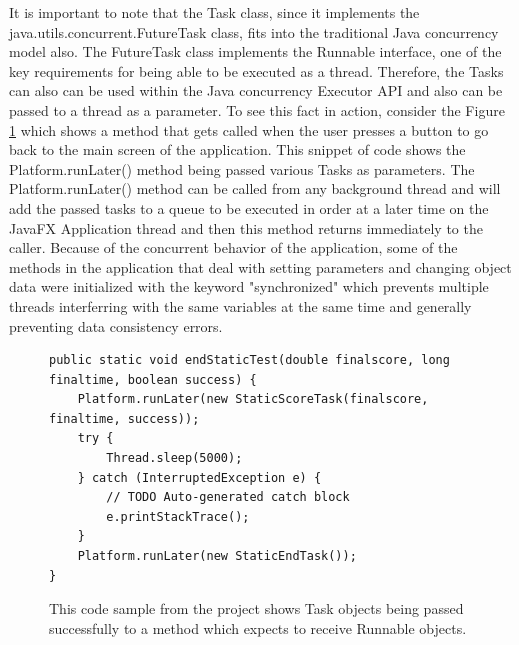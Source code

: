 It is important to note that the Task class, since it implements the java.utils.concurrent.FutureTask class, fits into the traditional Java concurrency model also. The FutureTask class implements the Runnable interface, one of the key requirements for being able to be executed as a thread. Therefore, the Tasks can also can be used within the Java concurrency Executor API and also can be passed to a thread as a parameter. To see this fact in action, consider the Figure \ref{fig:platformRunLater} which shows a method that gets called when the user presses a button to go back to the main screen of the application. This snippet of code shows the Platform.runLater() method being passed various Tasks as parameters. The Platform.runLater() method can be called from any background thread and will add the passed tasks to a queue to be executed in order at a later time on the JavaFX Application thread and then this method returns immediately to the caller. Because of the concurrent behavior of the application, some of the methods in the application that deal with setting parameters and changing object data were initialized with the keyword "synchronized" which prevents multiple threads interferring with the same variables at the same time and generally preventing data consistency errors. 

\begin{figure}[th]
\centering
\begin{lstlisting}
public static void endStaticTest(double finalscore, long finaltime, boolean success) {
	Platform.runLater(new StaticScoreTask(finalscore, finaltime, success));
	try {
		Thread.sleep(5000);
	} catch (InterruptedException e) {
		// TODO Auto-generated catch block
		e.printStackTrace();
	}
	Platform.runLater(new StaticEndTask());
}
\end{lstlisting}
\caption[Passing Task as Parameter]{This code sample from the project shows Task objects being passed successfully to a method which expects to receive Runnable objects.}
\label{fig:platformRunLater}
\end{figure}

